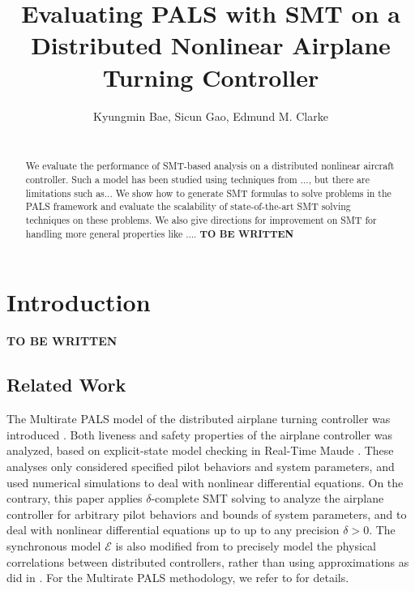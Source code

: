 \documentclass{sig-alternate}
\begin{document}
\title{Evaluating PALS with SMT on a Distributed Nonlinear Airplane Turning Controller
}

\author{
Kyungmin Bae, Sicun Gao, Edmund M. Clarke\\
\\
}

\maketitle
\begin{abstract}
We evaluate the performance of SMT-based analysis on a distributed
nonlinear aircraft controller. Such a model has been studied using
techniques from ..., but there are limitations such as... We show how
to generate SMT formulas to solve problems in the PALS framework and
evaluate the scalability of state-of-the-art SMT solving techniques on
these problems. We also give directions for improvement on SMT for
handling more general properties like ....
\textbf{TO BE WRITTEN}
\end{abstract}

\section{Introduction}

\textbf{TO BE WRITTEN}

\newpage


\subsection{Related Work}

The Multirate PALS model of the distributed airplane
turning controller was introduced \cite{ftscs-journal}.
Both liveness and safety properties of the airplane controller was analyzed,
based on explicit-state model checking in Real-Time Maude \cite{journ-rtm}.
These analyses only considered  specified pilot behaviors and system parameters,
and used numerical simulations to deal with nonlinear differential equations.
%
On the contrary, 
this paper applies $\delta$-complete SMT solving 
to analyze the airplane controller
for arbitrary pilot behaviors and bounds of system parameters,
and to deal with nonlinear differential equations up to 
up to any precision $\delta > 0$.
The synchronous model $\mathcal{E}$ 
is also modified from \cite{ftscs-journal} to precisely model
the physical correlations between distributed controllers,
rather than using approximations as did in \cite{ftscs-journal}.
For the Multirate PALS methodology,
we refer to \cite{ftscs-journal,mr-pals-journal,pals-tcs} for details.
\end{document}
